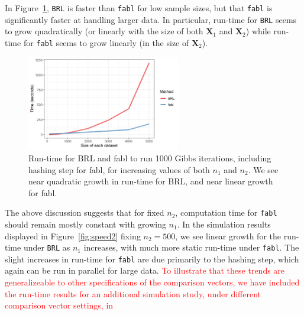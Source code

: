 \documentclass[ba]{imsart}
\begin{document}
	In Figure~\ref{fig:speed1}, \texttt{BRL} is faster than \texttt{fabl} for low sample sizes, but that \texttt{fabl} is significantly faster at handling larger data. In particular, run-time for \texttt{BRL} seems to grow quadratically (or linearly with the size of both $\bm{X}_1$ and $\bm{X}_2$) while run-time for \texttt{fabl} seems to grow linearly (in the size of $\bm{X}_2$).
	
	\begin{figure}[t]
		\begin{center} \includegraphics[width=0.6\textwidth]{../notes/figures/sadinle_speed_plot2} 
			\caption{Run-time for BRL and fabl to run 1000 Gibbs iterations, including hashing step for fabl, for increasing values of both $n_1$ and $n_2$. We see near quadratic growth in run-time for BRL, and near linear growth for fabl.}\label{fig:speed1}
		\end{center}
	\end{figure}
	
	The above discussion suggests that for fixed \(n_2\), computation time for \texttt{fabl} should remain mostly constant with growing \(n_1\). In the simulation results displayed in Figure~\ref{fig:speed2} fixing \(n_2 = 500\), we see linear growth for the run-time under \texttt{BRL} as \(n_1\) increases, with much more static run-time under \texttt{fabl}. The slight increases in run-time for \texttt{fabl} are due primarily to the hashing step, which again can be run in parallel for large data. \textcolor{red}{To illustrate that these trends are generalizeable to other specifications of the comparison vectors, we have included the run-time results for an additional simulation study, under different comparison vector settings, in }
	
\end{document}
